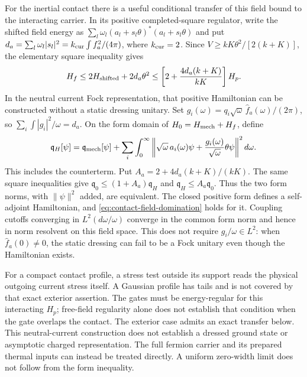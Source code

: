 For the inertial contact there is a useful conditional transfer of
this field bound to the interacting carrier. In its positive
completed-square regulator, write the shifted field energy as
$\sum_l\omega_l(a_l+s_l\theta)^*(a_l+s_l\theta)$ and put
$d_a=\sum_l\omega_l|s_l|^2
=k_{\rm cur}\int f_a^2/(4\pi)$, where $k_{\rm cur}=2$.
Since $V\ge kK\theta^2/[2(k+K)]$, the elementary square inequality gives
\begin{equation}\label{eq:contact-field-domination}
 H_f\le 2H_{\rm shifted}+2d_a\theta^2
 \le\left[2+\frac{4d_a(k+K)}{kK}\right]H_p.
\end{equation}
In the neutral current Fock representation, that positive Hamiltonian
can be constructed without a static dressing unitary. Set
$g_i(\omega)=q_i\sqrt{\omega}\,\widehat f_a(\omega)/(2\pi)$, so
$\sum_i\int|g_i|^2/\omega=d_a$. On the form domain of
$H_0=H_{\rm mech}+H_f$, define
\begin{equation}\label{eq:current-positive-form}
 \mathfrak q_H[\psi]=\mathfrak q_{\rm mech}[\psi]+
 \sum_i\int_0^\infty
 \left\|\sqrt{\omega}\,a_i(\omega)\psi+
          \frac{g_i(\omega)}{\sqrt{\omega}}\theta\psi\right\|^2d\omega.
\end{equation}
This includes the counterterm. Put
$A_a=2+4d_a(k+K)/(kK)$. The same square inequalities give
$\mathfrak q_0\le(1+A_a)\mathfrak q_H$ and
$\mathfrak q_H\le A_a\mathfrak q_0$. Thus the two form norms,
with $\|\psi\|^2$ added, are equivalent. The closed positive form
defines a self-adjoint Hamiltonian, and
\eqref{eq:contact-field-domination} holds for it.
Coupling cutoffs converging in $L^2(d\omega/\omega)$ converge in
the common form norm and hence in norm resolvent on this field space.
This does not require $g_i/\omega\in L^2$: when
$\widehat f_a(0)\ne0$, the static dressing can fail to be a Fock
unitary even though the Hamiltonian exists.

For a compact contact profile,
a stress test outside its support reads the physical outgoing
current stress itself. A Gaussian profile has tails and is not
covered by that exact exterior assertion.
The gates must be energy-regular for this interacting $H_p$;
free-field regularity alone does not establish that condition when
the gate overlaps the contact. The exterior case admits an exact transfer
below.
This neutral-current construction does not establish a dressed ground
state or asymptotic charged representation. The full fermion carrier
and its prepared thermal inputs can instead be treated directly.
A uniform zero-width limit does not follow from the form inequality.

